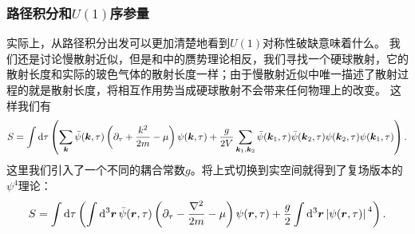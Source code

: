 \documentclass[hyperref, UTF8, a4paper]{ctexart}
\begin{document}
\subsubsection{路径积分和$U(1)$序参量}

实际上，从路径积分出发可以更加清楚地看到$U(1)$对称性破缺意味着什么。
我们还是讨论慢散射近似，但是和中的赝势理论相反，我们寻找一个硬球散射，它的散射长度和实际的玻色气体的散射长度一样；由于慢散射近似中唯一描述了散射过程的就是散射长度，将相互作用势当成硬球散射不会带来任何物理上的改变。
这样我们有
\[
    S = \int \dd{\tau} \left( 
        \sum_{\vb*{k}} \bar{\psi}(\vb*{k}, \tau) \left( \partial_\tau + \frac{k^2}{2m} - \mu \right) \psi(\vb*{k}, \tau) 
        + \frac{g}{2V} \sum_{\vb*{k}_1, \vb*{k}_2} \bar{\psi}(\vb*{k}_1, \tau) \bar{\psi}(\vb*{k}_2, \tau) \psi(\vb*{k}_2, \tau) \psi(\vb*{k}_1, \tau) 
    \right).
\]
这里我们引入了一个不同的耦合常数$g$。将上式切换到实空间就得到了复场版本的$\psi^4$理论：
\begin{equation}
    S = \int \dd{\tau} \left( 
        \int \dd[3]{\vb*{r}} \bar{\psi}(\vb*{r}, \tau) \left( \partial_\tau - \frac{\laplacian}{2m} - \mu \right) \psi(\vb*{r}, \tau) 
        + \frac{g}{2} \int \dd[3]{\vb*{r}} \abs*{\psi(\vb*{r}, \tau)}^4 
    \right).
\end{equation}
\end{document}
